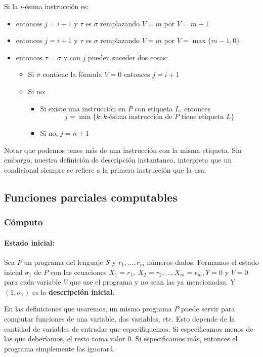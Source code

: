 Si la $i$-ésima instrucción es:
\begin{itemize}
	\item {} entonces $j = i + 1$ y $\tau$ es $\sigma$ remplazando $V = m$ por $V = m+1$
	\item {} entonces $j = i + 1$ y $\tau$ es $\sigma$ remplazando $V = m$ por $V = \max\{m-1, 0\}$
	\item {} entonces $\tau = \sigma$ y con $j$ pueden suceder dos cosas:
	\begin{itemize}
		\item Si $\sigma$ contiene la fórmula $V = 0$ entonces $j = i + 1$
		\item Si no:
		\begin{itemize}
			\item Si existe una instrucción en $P$ con etiqueta $L$, entonces $$j =  \min\{k:k\text{-ésima instrucción de } P \text{ tiene etiqueta } L\}$$
			\item Si no, $j = n + 1$	
		\end{itemize}
	\end{itemize}
\end{itemize}

Notar que podemos tenes más de una instrucción con la misma etiqueta. Sin embargo, nuestra definición de descripción instantanea, interpreta que un condicional siempre se refiere a la primera instrucción que la usa.

\subsection{Funciones parciales computables}

\subsubsection{Cómputo}
\paragraph{Estado inicial:} Sea $P$ un programa del lenguaje $\mathcal{S}$ y $r_1,\dots, r_m$ números dados. Formamos el estado inicial $\sigma_1$ de $P$ con las ecuaciones $X_1 = r_1,~X_2=r_2,\dots,X_m = r_m, Y = 0$ y $V=0$ para cada variable $V$ que use el programa y no sean las ya mencionadas. Y $(1,\sigma_1)$ es la \textbf{descripción inicial}.

En las definiciones que usaremos, un mismo programa $P$ puede servir para computar funciones de una variable, dos variables, etc. Esto depende de la cantidad de variables de entradas que especifiquemos. Si especificamos menos de las que deberíamos, el resto toma valor $0$. Si especificamos más, entonces el programa simplemente las ignorará.

